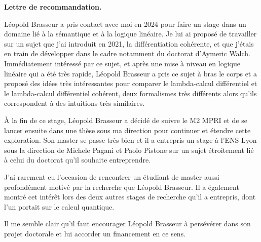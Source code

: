 \documentclass[12pt,pdftex]{letter}
\begin{document}
 \address{\vspace*{2cm}\\
 }

\signature{
\vspace{-2cm}
\texttt{[image: s4.jpg]}\\
Thomas Ehrhard\\ 
Directeur de recherche au CNRS\\
IRIF, UMR 8243
}

\begin{letter}{}

\newcommand\Name{Léopold Brasseur}
\newcommand\Fname{Brasseur}
\newcommand\Pname{Léopold}


\opening{\textbf{Lettre de recommandation.}}

\Name{} a pris contact avec moi en 2024 pour faire un stage dans un
domaine lié à la sémantique et à la logique linéaire.
%
Je lui ai proposé de travailler sur un sujet que j'ai introduit en
2021, la différentiation cohérente, et que j'étais en train de développer
dans le cadre notamment du doctorat d'Aymeric Walch.
%
Immédiatement intéressé par ce sujet, et après une mise à niveau en
logique linéaire qui a été très rapide, \Name{} a pris ce sujet à bras
le corps et a proposé des idées très intéressantes pour comparer le
lambda-calcul différentiel et le lambda-calcul différentiel cohérent,
deux formalismes très différents alors qu'ils correspondent à des
intuitions très similaires.

À la fin de ce stage, \Name{} a décidé de suivre le M2 MPRI et de se
lancer ensuite dans une thèse sous ma direction pour continuer et
étendre cette exploration.
%
Son master se passe très bien et il a entrepris un stage à l'ENS Lyon
sous la direction de Michele Pagani et Paolo Pistone sur un sujet
étroitement lié à celui du doctorat qu'il souhaite entreprendre.

J'ai rarement eu l'occasion de rencontrer un étudiant de master aussi
profondément motivé par la recherche que \Name{}.
%
Il a également montré cet intérêt lors des deux autres stages de
recherche qu'il a entrepris, dont l'un portait sur le calcul
quantique.
%


Il me semble clair qu'il faut encourager \Name{} à
persévérer dans son projet doctorale et lui accorder un financement en
ce sens.



  \closing{\ }

\end{letter}
\end{document}
